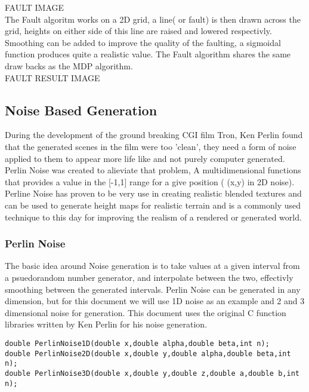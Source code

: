 FAULT IMAGE\\

The Fault algoritm works on a 2D grid, a line( or fault) is then drawn across the
grid, heights on either side of this line are raised and lowered respectivly.
Smoothing can be added to improve the quality of the faulting, a sigmoidal 
function produces quite a realistic value. The Fault algorithm shares the same
draw backs as the MDP algorithm.\\

FAULT RESULT IMAGE\\

\subsection{Noise Based Generation}
During the development of the ground breaking CGI film Tron, Ken Perlin found 
that the generated scenes in the film were too 'clean', they need a form of noise
applied to them to appear more life like and not purely computer generated. 
Perlin Noise was created to alieviate that problem, A multidimensional functions
that provides a value in the [-1,1] range for a give position ( (x,y) in 2D 
noise). Perline Noise has proven to be very use in creating realistic blended 
textures and can be used to generate height maps for realistic terrain and is a 
commonly used technique to this day for improving the realism of a rendered or
generated world.\\

\subsubsection*{Perlin Noise}
The basic idea around Noise generation is to take values at a given interval from
a psuedorandom number generator, and interpolate between the two, effectivly 
smoothing between the generated intervals. Perlin Noise can be generated in any
dimension, but for this document we will use 1D noise as an example and 2 and 
3 dimensional noise for generation. This document uses the original C function
libraries written by Ken Perlin for his noise generation.\\ 

\begin{lstlisting}
double PerlinNoise1D(double x,double alpha,double beta,int n);
double PerlinNoise2D(double x,double y,double alpha,double beta,int n);
double PerlinNoise3D(double x,double y,double z,double a,double b,int n);
\end{lstlisting}

